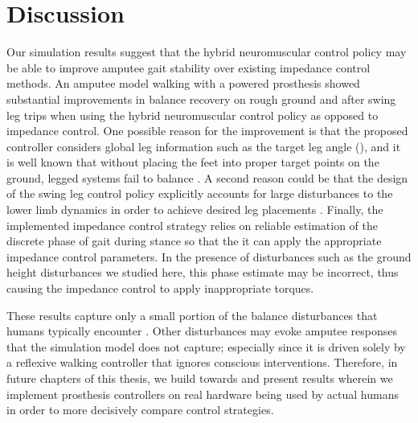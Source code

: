\section{Discussion}\label{sec:completed_comparison_discuss}

Our simulation results suggest that the hybrid neuromuscular control policy may
be able to improve amputee gait stability over existing impedance control
methods. An amputee model walking with a powered prosthesis showed substantial
improvements in balance recovery on rough ground and after swing leg trips when
using the hybrid neuromuscular control policy as opposed to impedance control.
One possible reason for the improvement is that the proposed controller
considers global leg information such as the target leg angle
(), and it is well known that without placing
the feet into proper target points on the ground, legged systems fail to balance
\citep{townsend1985biped,raibert1986legged,kajita20013d,
seyfarth2002movement,pratt2006capture,wu20133}. A second reason could be that
the design of the swing leg control policy explicitly accounts for large
disturbances to the lower limb dynamics in order to achieve desired leg
placements \citep{desai2012robust}. Finally, the implemented impedance control
strategy relies on reliable estimation of the discrete phase of gait during
stance so that the it can apply the appropriate impedance control parameters. In
the presence of disturbances such as the ground height disturbances we studied
here, this phase estimate may be incorrect, thus causing the impedance control
to apply inappropriate torques.  

These results capture only a small portion of the balance disturbances that
humans typically encounter \citep{robinovitch2013video}. Other disturbances may
evoke amputee responses that the simulation model does not capture; especially
since it is driven solely by a reflexive walking controller that ignores
conscious interventions. Therefore, in future chapters of this thesis, we build
towards and present results wherein we implement prosthesis controllers on real
hardware being used by actual humans in order to more decisively compare control
strategies.
